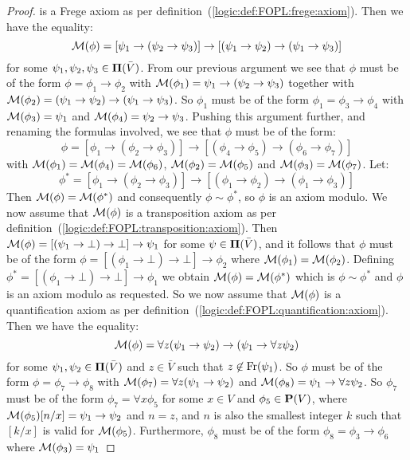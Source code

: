 \begin{proof}
is a Frege axiom as per
definition~(\ref{logic:def:FOPL:frege:axiom}). Then we have the
equality:
    \[
    {\cal M}(\phi)=[\psi_{1}\to(\psi_{2}\to\psi_{3})]\to[(\psi_{1}\to\psi_{2})\to(\psi_{1}\to\psi_{3})]
    \]
for some $\psi_{1},\psi_{2},\psi_{3}\in\mbox{${\bf\Pi}(\bar{V})$}$. From our previous
argument we see that $\phi$ must be of the form
$\phi=\phi_{1}\to\phi_{2}$ with ${\cal
M}(\phi_{1})=\psi_{1}\to(\psi_{2}\to\psi_{3})$ together with ${\cal
M}(\phi_{2})=(\psi_{1}\to\psi_{2})\to(\psi_{1}\to\psi_{3})$. So
$\phi_{1}$ must be of the form $\phi_{1}=\phi_{3}\to\phi_{4}$ with
${\cal M}(\phi_{3})=\psi_{1}$ and ${\cal
M}(\phi_{4})=\psi_{2}\to\psi_{3}$. Pushing this argument further,
and renaming the formulas involved, we see that $\phi$ must be of
the form:
    \[
    \phi=[\phi_{1}\to(\phi_{2}\to\phi_{3})]\to[(\phi_{4}\to\phi_{5})\to(\phi_{6}\to\phi_{7})]
    \]
with ${\cal M}(\phi_{1})={\cal M}(\phi_{4})={\cal M}(\phi_{6})$,
${\cal M}(\phi_{2})={\cal M}(\phi_{5})$ and ${\cal
M}(\phi_{3})={\cal M}(\phi_{7})$. Let:
    \[
    \phi^{*}=[\phi_{1}\to(\phi_{2}\to\phi_{3})]\to[(\phi_{1}\to\phi_{2})\to(\phi_{1}\to\phi_{3})]
    \]
Then ${\cal M}(\phi)={\cal M}(\phi^{*})$ and consequently
$\phi\sim\phi^{*}$, so $\phi$ is an axiom modulo. We now assume that
${\cal M}(\phi)$ is a transposition axiom as per
definition~(\ref{logic:def:FOPL:transposition:axiom}). Then ${\cal
M}(\phi)=[(\psi_{1}\to\bot)\to\bot]\to\psi_{1}$ for some
$\psi\in\mbox{${\bf\Pi}(\bar{V})$}$, and it follows that $\phi$ must be of the form
$\phi=[(\phi_{1}\to\bot)\to\bot]\to\phi_{2}$ where ${\cal
M}(\phi_{1})={\cal M}(\phi_{2})$. Defining
$\phi^{*}=[(\phi_{1}\to\bot)\to\bot]\to\phi_{1}$ we obtain ${\cal
M}(\phi)={\cal M}(\phi^{*})$ which is $\phi\sim\phi^{*}$ and $\phi$
is an axiom modulo as requested. So we now assume that ${\cal
M}(\phi)$ is a quantification axiom as per
definition~(\ref{logic:def:FOPL:quantification:axiom}). Then we have
the equality:
    \[
    {\cal M}(\phi)=\forall z(\psi_{1}\to\psi_{2})\to(\psi_{1}
    \to\forall z \psi_{2})
    \]
for some $\psi_{1},\psi_{2}\in\mbox{${\bf\Pi}(\bar{V})$}$ and $z\in\bar{V}$ such that
$z\not\in\mbox{\rm Fr}(\psi_{1})$. So $\phi$ must be of the form
$\phi=\phi_{7}\to\phi_{8}$ with ${\cal M}(\phi_{7})=\forall
z(\psi_{1}\to\psi_{2})$ and ${\cal M}(\phi_{8})=\psi_{1}\to\forall
z\psi_{2}$. So $\phi_{7}$ must be of the form $\phi_{7}=\forall
x\phi_{5}$ for some $x\in V$ and $\phi_{5}\in\mbox{${\bf P}(V)$}$, where ${\cal
M}(\phi_{5})[n/x]=\psi_{1}\to\psi_{2}$ and $n=z$, and $n$ is also
the smallest integer $k$ such that $[k/x]$ is valid for ${\cal
M}(\phi_{5})$. Furthermore, $\phi_{8}$ must be of the form
$\phi_{8}=\phi_{3}\to\phi_{6}$ where ${\cal M}(\phi_{3})=\psi_{1}$

\end{proof}

